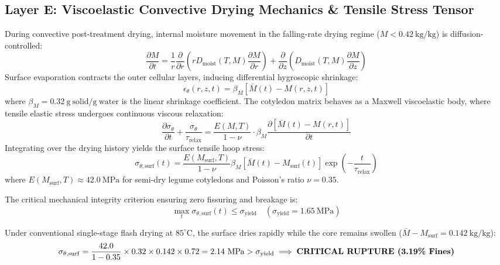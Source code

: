 \documentclass[10pt,a4paper]{article}
\begin{document}
\subsection{Layer E: Viscoelastic Convective Drying Mechanics \& Tensile Stress Tensor}
During convective post-treatment drying, internal moisture movement in the falling-rate drying regime ($M < 0.42\ \mathrm{kg/kg}$) is diffusion-controlled:
\begin{equation}
\frac{\partial M}{\partial t} = \frac{1}{r} \frac{\partial}{\partial r} \left( r D_{\mathrm{moist}}(T, M) \frac{\partial M}{\partial r} \right) + \frac{\partial}{\partial z} \left( D_{\mathrm{moist}}(T, M) \frac{\partial M}{\partial z} \right)
\end{equation}
Surface evaporation contracts the outer cellular layers, inducing differential hygroscopic shrinkage:
\begin{equation}
\epsilon_{\theta}(r, z, t) = \beta_M \left[ \bar{M}(t) - M(r, z, t) \right]
\end{equation}
where $\beta_M = 0.32\ \mathrm{g\ solid/g\ water}$ is the linear shrinkage coefficient. The cotyledon matrix behaves as a Maxwell viscoelastic body, where tensile elastic stress undergoes continuous viscous relaxation:
\begin{equation}
\frac{\partial \sigma_{\theta}}{\partial t} + \frac{\sigma_{\theta}}{\tau_{\mathrm{relax}}} = \frac{E(M, T)}{1 - \nu} \cdot \beta_M \frac{\partial \left[ \bar{M}(t) - M(r, t) \right]}{\partial t}
\end{equation}
Integrating over the drying history yields the surface tensile hoop stress:
\begin{equation}
\sigma_{\theta,\mathrm{surf}}(t) = \frac{E(M_{\mathrm{surf}}, T)}{1 - \nu} \beta_M \left[ \bar{M}(t) - M_{\mathrm{surf}}(t) \right] \exp\left( - \frac{t}{\tau_{\mathrm{relax}}} \right)
\end{equation}
where $E(M_{\mathrm{surf}}, T) \approx 42.0\ \mathrm{MPa}$ for semi-dry legume cotyledons and Poisson's ratio $\nu = 0.35$.

The critical mechanical integrity criterion ensuring zero fissuring and breakage is:
\begin{equation}
\max_{t} \sigma_{\theta,\mathrm{surf}}(t) \le \sigma_{\mathrm{yield}} \quad (\sigma_{\mathrm{yield}} = 1.65\ \mathrm{MPa})
\end{equation}

Under conventional single-stage flash drying at $85^\circ\mathrm{C}$, the surface dries rapidly while the core remains swollen ($\bar{M} - M_{\mathrm{surf}} = 0.142\ \mathrm{kg/kg}$):
\begin{equation}
\sigma_{\theta,\mathrm{surf}} = \frac{42.0}{1 - 0.35} \times 0.32 \times 0.142 \times 0.72 = 2.14\ \mathrm{MPa} > \sigma_{\mathrm{yield}} \implies \text{\textbf{CRITICAL RUPTURE (3.19\% Fines)}}
\end{equation}
\end{document}
